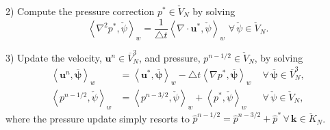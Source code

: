 \documentclass[11pt, oneside]{article}
\newcommand{\N}[1]{\check{#1}}
\newcommand{\D}[1]{\overline{#1}}
\begin{document}
2) Compute the pressure correction $p^*\in \N{V}_N$ by solving
\begin{equation}
\left< \nabla^2 p^*, \N{\psi} \right>_w = \frac{1}{\triangle t} \left<\nabla \cdot \bm{u}^*, \N{\psi} \right>_w\,\, \forall \, \N{\psi} \in \N{V}_N. \label{eq:pcorr}
\end{equation}

3) Update the velocity, $\bm{u}^n \in \D{V}_N^3$, and pressure, $p^{n-1/2} \in \N{V}_N$, by solving
\begin{align}
\left< \bm{u}^n, \bm{\D{\psi}}\right>_w &= \left< \bm{u}^*, \bm{\D{\psi}}\right>_w - \triangle t \left< \nabla p^*, \bm{\D{\psi}} \right>_w \,\,  &\forall \, \bm{\D{\psi}} \in \D{V}_N^3, \label{eq:u_update} \\
\left<p^{n-1/2}, \N{\psi}\right>_w &= \left<p^{n-3/2}, \N{\psi}\right>_w + \left<p^*, \N{\psi}\right>_w \,\, &\forall \, \N{\psi} \in \N{V}_N,\label{eq:pres_update}
\end{align}
where the pressure update simply resorts to $\hat{p}^{n-1/2} = \hat{p}^{n-3/2} + \hat{p}^* \, \forall \, \bm{k}\in \N{K}_N$.
\end{document}
